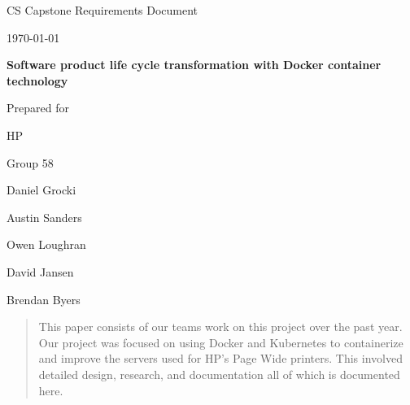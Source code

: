 \documentclass[onecolumn, draftclsnofoot,10pt, compsoc]{IEEEtran}
\def \CapstoneTeamName{		The Cleverly Named Team}
\def \CapstoneTeamNumber{	58}
\def \GroupMemberOne{		Daniel Grocki}
\def \GroupMemberTwo{		Austin Sanders}
\def \GroupMemberThree{		Owen Loughran}
\def \GroupMemberFour{		David Jansen}
\def \GroupMemberFive{		Brendan Byers}
\def \CapstoneProjectName{	Software product life cycle transformation with Docker container technology}
\def \CapstoneSponsorCompany{HP}
\def \CapstoneSponsorPerson{Bryan Crampton}
\def \CapstoneSponsorPersonTwo{Matt MacClary}
\def \DocType{		%
				Requirements Document
				}
\newcommand{\NameSigPair}[1]{\par
\makebox[2.75in][r]{#1} \hfil 	\makebox[3.25in]{\makebox[2.25in]{\hrulefill} \hfill		\makebox[.75in]{\hrulefill}}
\par\vspace{-12pt} \textit{\tiny\noindent
\makebox[2.75in]{} \hfil		\makebox[3.25in]{\makebox[2.25in][r]{Signature} \hfill	\makebox[.75in][r]{Date}}}}
\begin{document}
\begin{titlepage}
    \begin{singlespace}
        \hfill 
        \par\vspace{.2in}
        \centering
        \scshape{
            \huge CS Capstone \DocType \par
            {\large\today}\par
            \vspace{.5in}
            \textbf{\Huge\CapstoneProjectName}\par
            \vfill
            {\large Prepared for}\par
            \Huge \CapstoneSponsorCompany\par
            \vspace{5pt}
            Group\CapstoneTeamNumber\par
            \vspace{5pt}
            {\Large
                {\GroupMemberOne}\par
                {\GroupMemberTwo}\par
                {\GroupMemberThree}\par
                {\GroupMemberFour}\par
                {\GroupMemberFive}\par
            }
            \vspace{20pt}
        }
        \begin{abstract}
            	This paper consists of our teams work on this project over the past year. Our project was focused on using Docker and Kubernetes to containerize and improve the servers used for HP's Page Wide printers. This involved detailed design, research, and documentation all of which is documented here. 

        \end{abstract}     
    \end{singlespace}
\end{titlepage}
\newpage
{}
\tableofcontents
\clearpage
\end{document}
